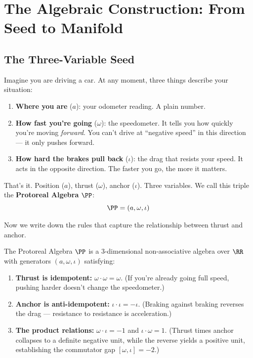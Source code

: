 \section{The Algebraic Construction: From Seed to Manifold}

\subsection{The Three-Variable Seed}\label{sec:seed}

Imagine you are driving a car. At any moment, three things describe your situation:
\begin{enumerate}
\item \textbf{Where you are} ($a$): your odometer reading. A plain number.
\item \textbf{How fast you're going} ($\omega$): the speedometer. It tells you how quickly you're moving \emph{forward}. You can't drive at ``negative speed'' in this direction --- it only pushes forward.
\item \textbf{How hard the brakes pull back} ($\iota$): the drag that resists your speed. It acts in the opposite direction. The faster you go, the more it matters.
\end{enumerate}

That's it. Position ($a$), thrust ($\omega$), anchor ($\iota$). Three variables. We call this triple the \textbf{Protoreal Algebra} $\PP$:
$$\PP = (a, \omega, \iota)$$

Now we write down the rules that capture the relationship between thrust and anchor.

\begin{definition}\label{def:protoreal}
The Protoreal Algebra $\PP$ is a 3-dimensional non-associative algebra over $\RR$ with generators $(a, \omega, \iota)$ satisfying:
\begin{enumerate}
\item \textbf{Thrust is idempotent:} $\omega \cdot \omega = \omega$. (If you're already going full speed, pushing harder doesn't change the speedometer.)
\item \textbf{Anchor is anti-idempotent:} $\iota \cdot \iota = -\iota$. (Braking against braking reverses the drag --- resistance to resistance is acceleration.)
\item \textbf{The product relations:} $\omega \cdot \iota = -1$ and $\iota \cdot \omega = 1$. (Thrust times anchor collapses to a definite negative unit, while the reverse yields a positive unit, establishing the commutator gap $[\omega, \iota] = -2$.)
\end{enumerate}
\end{definition}

